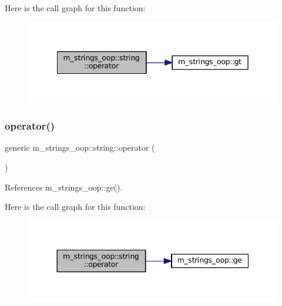 Here is the call graph for this function\+:\nopagebreak
\begin{figure}[H]
\begin{center}
\leavevmode
\includegraphics[width=342pt]{structm__strings__oop_1_1string_ae1b6295dd1d93cf270435c91fa29ce01_cgraph}
\end{center}
\end{figure}
\mbox{\label{structm__strings__oop_1_1string_a0ec9416af2c9677346cebade8a22187f}} 
\subsubsection{\texorpdfstring{operator()}{operator()}\hspace{0.1cm}{\footnotesize\ttfamily [4/10]}}
{\footnotesize\ttfamily generic m\+\_\+strings\+\_\+oop\+::string\+::operator (\begin{DoxyParamCaption}{ }\end{DoxyParamCaption})\hspace{0.3cm}{\ttfamily [private]}}



References m\+\_\+strings\+\_\+oop\+::ge().

Here is the call graph for this function\+:\nopagebreak
\begin{figure}[H]
\begin{center}
\leavevmode
\includegraphics[width=344pt]{structm__strings__oop_1_1string_a0ec9416af2c9677346cebade8a22187f_cgraph}
\end{center}
\end{figure}
\mbox{\label{structm__strings__oop_1_1string_ac18c4ae9c5afc0f832e18718a03dedab}} 
